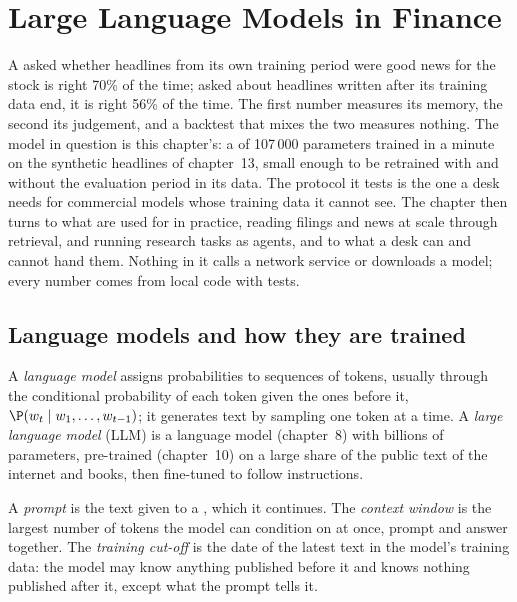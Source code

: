 \chapter{Large Language Models in Finance}\label{ch:ml:large-language-models-in-finance}

A  asked whether headlines from its own training period were good news for the stock is right 70\% of the
time; asked about headlines written after its training data end, it is right 56\% of the time. The first number measures
its memory, the second its judgement, and a backtest that mixes the two measures nothing. The model in question is this
chapter's: a  of 107\,000 parameters trained in a minute on the synthetic headlines of chapter~13, small enough to
be retrained with and without the evaluation period in its data. The protocol it tests is the one a desk needs for
commercial models whose training data it cannot see. The chapter then turns to what  are used for in
practice, reading filings and news at scale through retrieval, and running research tasks as agents, and to what a desk can
and cannot hand them. Nothing in it calls a network service or downloads a model; every number comes from local code with
tests.

\section{Language models and how they are trained}

\begin{definition}\label{def:ml:large-language-models-in-finance:lm}
A \emph{language model} assigns probabilities to sequences of tokens, usually through the conditional
probability of each token given the ones before it, $\P(w_t\mid w_1,\dots,w_{t-1})$; it generates text by sampling one
token at a time. A \emph{large language model} (LLM) is a  language model (chapter~8)
with billions of parameters, pre-trained (chapter~10) on a large share of the public text of the internet and books, then
fine-tuned to follow instructions.
\end{definition}

\begin{definition}\label{def:ml:large-language-models-in-finance:prompt}
A \emph{prompt} is the text given to a , which it continues. The \emph{context
window} is the largest number of tokens the model can condition on at once, prompt and answer
together. The \emph{training cut-off} is the date of the latest text in the model's training data:
the model may know anything published before it and knows nothing published after it, except what the prompt tells it.
\end{definition}

